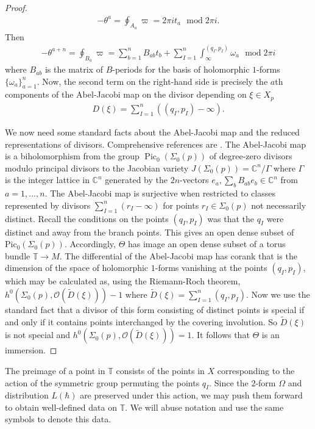 \documentclass[a4paper,12pt,reqno]{amsart}
\numberwithin{equation}{section}
\numberwithin{counter2}{section}
\begin{document}
\begin{proof}
\begin{align}
-\theta^a = \oint_{A_a} \varpi = 2\pi i t_a \, \  \operatorname{mod} 2\pi i.  
\end{align}
Then
\begin{align}
-\theta^{a+n} = \oint_{B_{a}} \varpi = \sum_{b=1}^{n}  B_{ab}t_b +  \sum_{I=1}^{n} \int_{\infty}^{(q_I,p_I)} \omega_a   \ \,  \operatorname{mod} 2 \pi i
\end{align}
where $B_{ab}$ is the matrix of $B$-periods for the basis of holomorphic $1$-forms $\{\omega_{a}\}_{a=1}^{n}$.  Now,  the second term on the right-hand side is precisely the $a$th components of the Abel-Jacobi map on the divisor depending on $\xi \in X_p$
\begin{align}\label{q_divisors}
D(\xi) = \sum_{I=1}^n ((q_I,p_I) - \infty).  
\end{align}

We now need some standard facts about the Abel-Jacobi map and the reduced representations of divisors.  Comprehensive references are \cite{ACGH, Mu}.  
The Abel-Jacobi map is a biholomorphism from the group $\operatorname{Pic}_0(\Sigma_0(p))$ of degree-zero divisors modulo principal divisors to the Jacobian variety $J(\Sigma_0(p)) = \mathbb{C}^{n} / \Gamma$ where $\Gamma$ is the integer lattice in $\mathbb{C}^{n}$ generated by the $2n$-vectors $e_a,  \sum_b B_{ab}e_b \in \mathbb{C}^n$ from $a = 1,...,n$.  The Abel-Jacobi map is surjective when restricted to classes represented by divisors $\sum_{I=1}^n (r_I - \infty)$ for points $r_I \in \Sigma_0(p)$ not necessarily distinct.
Recall the conditions on the points $(q_I,p_I)$ was that the $q_I$ were distinct and away from the branch points.  This gives an open dense subset of $\text{Pic}_0(\Sigma_0(p))$.  Accordingly,  $\Theta$ has image an open dense subset of a torus bundle $\mathbb{T} \to M$.  The differential of the Abel-Jacobi map has corank that is the dimension of the space of holomorphic $1$-forms vanishing at the points $(q_I,p_I)$,  which may be calculated as,  using the Riemann-Roch theorem,  $h^0(\Sigma_0(p),\mathcal{O}(\tilde{D}(\xi))) - 1$ where $\tilde{D}(\xi) = \sum_{I=1}^{n} (q_I,p_I)$.  Now we use the standard fact that a divisor of this form consisting of distinct points is special if and only if it contains points interchanged by the covering involution.  So $\tilde{D}(\xi) $ is not special and $h^0(\Sigma_0(p),\mathcal{O}(\tilde{D}(\xi))) = 1$.  It follows that  $\Theta$ is an immersion.  
\end{proof}
The preimage of a point in $\mathbb{T}$ consists of the points in $X$ corresponding to the action of the symmetric group permuting the points $q_I$.  Since the $2$-form $\Omega$ and distribution $L(\hbar)$ are preserved under this action,  we may push them forward to obtain well-defined data on $\mathbb{T}$.  We will abuse notation and use the same symbols to denote this data.  \par
\end{document}
